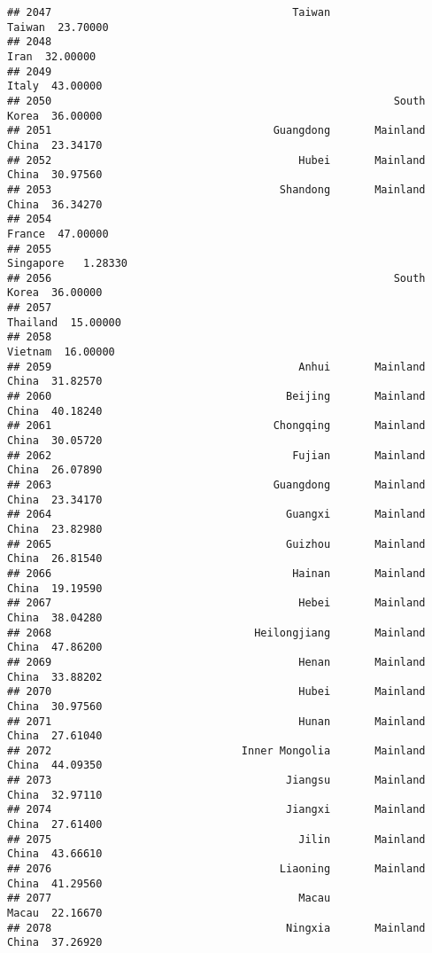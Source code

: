 \documentclass[
]{article}
\begin{document}
\begin{verbatim}
## 2047                                      Taiwan               Taiwan  23.70000
## 2048                                                             Iran  32.00000
## 2049                                                            Italy  43.00000
## 2050                                                      South Korea  36.00000
## 2051                                   Guangdong       Mainland China  23.34170
## 2052                                       Hubei       Mainland China  30.97560
## 2053                                    Shandong       Mainland China  36.34270
## 2054                                                           France  47.00000
## 2055                                                        Singapore   1.28330
## 2056                                                      South Korea  36.00000
## 2057                                                         Thailand  15.00000
## 2058                                                          Vietnam  16.00000
## 2059                                       Anhui       Mainland China  31.82570
## 2060                                     Beijing       Mainland China  40.18240
## 2061                                   Chongqing       Mainland China  30.05720
## 2062                                      Fujian       Mainland China  26.07890
## 2063                                   Guangdong       Mainland China  23.34170
## 2064                                     Guangxi       Mainland China  23.82980
## 2065                                     Guizhou       Mainland China  26.81540
## 2066                                      Hainan       Mainland China  19.19590
## 2067                                       Hebei       Mainland China  38.04280
## 2068                                Heilongjiang       Mainland China  47.86200
## 2069                                       Henan       Mainland China  33.88202
## 2070                                       Hubei       Mainland China  30.97560
## 2071                                       Hunan       Mainland China  27.61040
## 2072                              Inner Mongolia       Mainland China  44.09350
## 2073                                     Jiangsu       Mainland China  32.97110
## 2074                                     Jiangxi       Mainland China  27.61400
## 2075                                       Jilin       Mainland China  43.66610
## 2076                                    Liaoning       Mainland China  41.29560
## 2077                                       Macau                Macau  22.16670
## 2078                                     Ningxia       Mainland China  37.26920

\end{verbatim}
\end{document}
